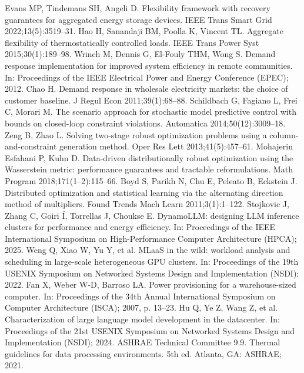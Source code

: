  Evans MP, Tindemans SH, Angeli D. Flexibility framework with recovery guarantees for aggregated energy storage devices. IEEE Trans Smart Grid 2022;13(5):3519--31.
 Hao H, Sanandaji BM, Poolla K, Vincent TL. Aggregate flexibility of thermostatically controlled loads. IEEE Trans Power Syst 2015;30(1):189--98.
 Wrinch M, Dennis G, El-Fouly THM, Wong S. Demand response implementation for improved system efficiency in remote communities. In: Proceedings of the IEEE Electrical Power and Energy Conference (EPEC); 2012.
 Chao H. Demand response in wholesale electricity markets: the choice of customer baseline. J Regul Econ 2011;39(1):68--88.
 Schildbach G, Fagiano L, Frei C, Morari M. The scenario approach for stochastic model predictive control with bounds on closed-loop constraint violations. Automatica 2014;50(12):3009--18.
 Zeng B, Zhao L. Solving two-stage robust optimization problems using a column-and-constraint generation method. Oper Res Lett 2013;41(5):457--61.
 Mohajerin Esfahani P, Kuhn D. Data-driven distributionally robust optimization using the Wasserstein metric: performance guarantees and tractable reformulations. Math Program 2018;171(1--2):115--66.
 Boyd S, Parikh N, Chu E, Peleato B, Eckstein J. Distributed optimization and statistical learning via the alternating direction method of multipliers. Found Trends Mach Learn 2011;3(1):1--122.
 Stojkovic J, Zhang C, Goiri \'I, Torrellas J, Choukse E. DynamoLLM: designing LLM inference clusters for performance and energy efficiency. In: Proceedings of the IEEE International Symposium on High-Performance Computer Architecture (HPCA); 2025.
 Weng Q, Xiao W, Yu Y, et al. MLaaS in the wild: workload analysis and scheduling in large-scale heterogeneous GPU clusters. In: Proceedings of the 19th USENIX Symposium on Networked Systems Design and Implementation (NSDI); 2022.
 Fan X, Weber W-D, Barroso LA. Power provisioning for a warehouse-sized computer. In: Proceedings of the 34th Annual International Symposium on Computer Architecture (ISCA); 2007, p. 13--23.
 Hu Q, Ye Z, Wang Z, et al. Characterization of large language model development in the datacenter. In: Proceedings of the 21st USENIX Symposium on Networked Systems Design and Implementation (NSDI); 2024.
 ASHRAE Technical Committee 9.9. Thermal guidelines for data processing environments. 5th ed. Atlanta, GA: ASHRAE; 2021.
